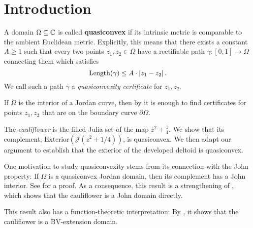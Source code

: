 


\section{Introduction}
A domain $\Omega\subseteq\mathbb{C}$ is called \textbf{quasiconvex }if its
intrinsic metric is comparable to the ambient Euclidean metric. Explicitly,
this means that there exists a constant $A\geq1$ such that every
two points $z_{1},z_{2}\in\Omega$ have a rectifiable path $\gamma:\left[0,1\right]\to\Omega$
connecting them which satisfies
\[
\operatorname{Length}(\gamma)\leq A\cdot\left|z_{1}-z_{2}\right|.
\]
We call such a path $\gamma$ a \emph{quasiconvexity certificate }for\emph{
$z_{1},z_{2}$.}

If $\Omega$ is the interior of a Jordan curve, then by \cite[Corollary F]{hakobyan_euclidean_2008}
it is enough to find certificates for points $z_{1},z_{2}$ that are
on the boundary curve $\partial\Omega$.%
\begin{comment}
It is also shown in \cite{hakobyan_euclidean_2008} that any quasidisk is quasiconvex.
\end{comment}

The \emph{cauliflower} is the filled Julia set of the map $z^2+\frac 14$.
We show that its complement, $\mathrm{Exterior}(\mathcal{J}(z^{2}+1/4))$,
is quasiconvex. We then adapt our argument to establish that the exterior of the developed deltoid is quasiconvex.



One motivation to study quasiconvexity stems from its connection with the
John property: If $\Omega$ is a quasiconvex Jordan domain, then its complement has a John interior. See \cite[Corollary 3.4]{hakobyan_euclidean_2008} for a proof.
As a consequence, this result is a strengthening of \cite[Theorem 6.1]{carleson_julia_1994}, which shows that the cauliflower is a John domain directly.

This result also has a function-theoretic interpretation: By \cite[Theorem 1.1]{koskela_geometric_2010}, it shows that the cauliflower is a BV-extension domain.

\begin{comment}
The Filled Julia set of $z^{2}+1/4$, called the cauliflower, has
an inward-pointing cusp and hence is not quasiconvex.
\end{comment}

\begin{comment}
Thus, for any $c$ in 

For values $c$ in quadratic polynomials $f_{c}(z)=z^{2}+c$
\end{comment}
\begin{comment}
If $f_{c}$ has an attracting fixed point then its Julia set $\mathcal{J}(f_{c})$
is a quasicircle, hence its interior and exterior are both quasiconvex.
This is the case for values of $c$ in the main cardioid of the Mandelbrot
set.
, i.e.\ for 
\[
c\in\left\{ -\frac{\lambda}{2}-\frac{\lambda^{2}}{4}:\,\left|\lambda\right|<1\right\} .
\]
\end{comment}

